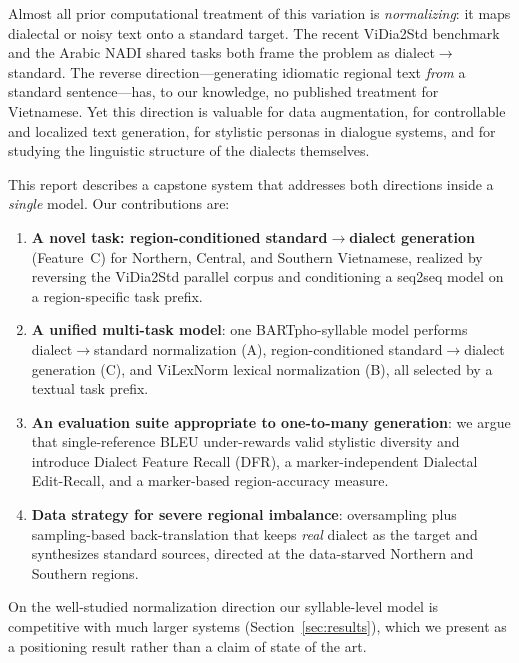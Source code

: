 \documentclass[11pt]{article}
\begin{document}
Almost all prior computational treatment of this variation is
\emph{normalizing}: it maps dialectal or noisy text onto a standard target. The
recent ViDia2Std benchmark \citep{ta2026vidia2std} and the Arabic NADI shared
tasks \citep{nadi2024} both frame the problem as dialect$\rightarrow$standard.
The reverse direction---generating idiomatic regional text \emph{from} a standard
sentence---has, to our knowledge, no published treatment for Vietnamese. Yet this
direction is valuable for data augmentation, for controllable and localized text
generation, for stylistic personas in dialogue systems, and for studying the
linguistic structure of the dialects themselves.

This report describes a capstone system that addresses both directions inside a
\emph{single} model. Our contributions are:

\begin{enumerate}[leftmargin=1.4em,itemsep=2pt,topsep=2pt]
  \item \textbf{A novel task: region-conditioned standard$\rightarrow$dialect
    generation} (Feature~C) for Northern, Central, and Southern Vietnamese,
    realized by reversing the ViDia2Std parallel corpus and conditioning a
    seq2seq model on a region-specific task prefix.
  \item \textbf{A unified multi-task model}: one BARTpho-syllable model performs
    dialect$\rightarrow$standard normalization (A), region-conditioned
    standard$\rightarrow$dialect generation (C), and ViLexNorm lexical
    normalization (B), all selected by a textual task prefix.
  \item \textbf{An evaluation suite appropriate to one-to-many generation}: we
    argue that single-reference BLEU under-rewards valid stylistic diversity
    \citep{edunov2018understanding} and introduce Dialect Feature Recall (DFR), a
    marker-independent Dialectal Edit-Recall, and a marker-based region-accuracy
    measure.
  \item \textbf{Data strategy for severe regional imbalance}: oversampling plus
    sampling-based back-translation \citep{edunov2018understanding} that keeps
    \emph{real} dialect as the target and synthesizes standard sources, directed
    at the data-starved Northern and Southern regions.
\end{enumerate}

On the well-studied normalization direction our syllable-level model is
competitive with much larger systems (Section~\ref{sec:results}), which we
present as a positioning result rather than a claim of state of the art.
\end{document}
